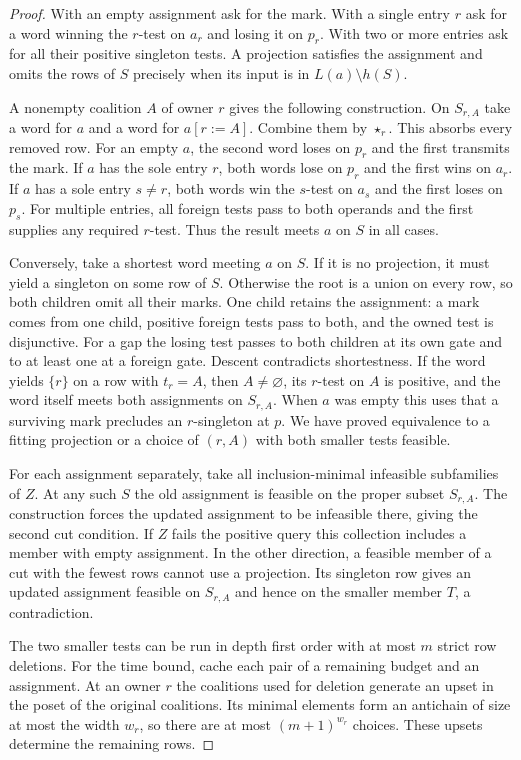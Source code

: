 \begin{proof}
With an empty assignment ask for the mark. With a single entry $r$
ask for a word winning the $r$-test on $a_r$ and losing it on $p_r$.
With two or more entries ask for all their positive singleton tests.
A projection satisfies the assignment and omits the rows of $S$
precisely when its input is in $L(a)\setminus h(S)$.

A nonempty coalition $A$ of owner $r$ gives the following construction.
On $S_{r,A}$ take a word for $a$ and a word for $a[r:=A]$.
Combine them by $\star_r$. This absorbs every removed row. For an
empty $a$, the second word loses on $p_r$ and the first transmits
the mark. If $a$ has the sole entry $r$, both words lose on $p_r$
and the first wins on $a_r$. If $a$ has a sole entry $s\ne r$, both
words win the $s$-test on $a_s$ and the first loses on $p_s$.
For multiple entries, all foreign tests pass to both operands and
the first supplies any required $r$-test. Thus the result meets $a$
on $S$ in all cases.

Conversely, take a shortest word meeting $a$ on $S$. If it is no
projection, it must yield a singleton on some row of $S$. Otherwise
the root is a union on every row, so both children omit all their
marks. One child retains the assignment: a mark comes from one child,
positive foreign tests pass to both, and the owned test is disjunctive.
For a gap the losing test passes to both children at its own gate and
to at least one at a foreign gate. Descent contradicts shortestness.
If the word yields $\{r\}$ on a row with $t_r=A$, then $A\ne\varnothing$,
its $r$-test on $A$ is positive, and the word itself meets both
assignments on $S_{r,A}$. When $a$ was empty this uses that a surviving
mark precludes an $r$-singleton at $p$. We have proved equivalence to
a fitting projection or a choice of $(r,A)$ with both smaller tests
feasible.

For each assignment separately, take all inclusion-minimal infeasible
subfamilies of $Z$. At any such $S$ the old assignment is feasible on
the proper subset $S_{r,A}$. The construction forces the updated
assignment to be infeasible there, giving the second cut condition.
If $Z$ fails the positive query this collection includes a member with
empty assignment. In the other direction, a feasible member of a cut
with the fewest rows cannot use a projection. Its singleton row gives
an updated assignment feasible on $S_{r,A}$ and hence on the smaller
member $T$, a contradiction.

The two smaller tests can be run in depth first order with at most $m$
strict row deletions. For the time bound, cache each pair of a remaining
budget and an assignment. At an owner $r$ the coalitions used for
deletion generate an upset in the poset of the original coalitions.
Its minimal elements form an antichain of size at most the width $w_r$,
so there are at most $(m+1)^{w_r}$ choices. These upsets determine the
remaining rows.


\end{proof}
